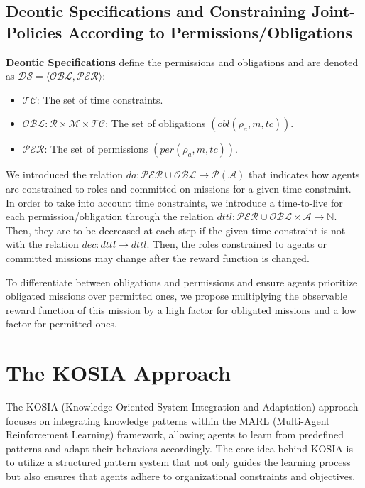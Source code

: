 \documentclass[sn-mathphys-num]{sn-jnl}%
\theoremstyle{thmstyleone}%
\theoremstyle{thmstyletwo}%
\theoremstyle{thmstylethree}%
\begin{document}
\subsection{Deontic Specifications and Constraining Joint-Policies According to Permissions/Obligations}

\textbf{Deontic Specifications} define the permissions and obligations and are denoted as $\mathcal{DS} = \langle \mathcal{OBL}, \mathcal{PER} \rangle$:

\begin{itemize}
    \item $\mathcal{TC}$: The set of time constraints.
    \item $\mathcal{OBL}: \mathcal{R} \times \mathcal{M} \times \mathcal{TC}$: The set of obligations $(obl(\rho_a, m, tc))$.
    \item $\mathcal{PER}$: The set of permissions $(per(\rho_a, m, tc))$.
\end{itemize}

We introduced the relation $da: \mathcal{PER} \cup \mathcal{OBL} \rightarrow \mathcal{P}(\mathcal{A})$ that indicates how agents are constrained to roles and committed on missions for a given time constraint. In order to take into account time constraints, we introduce a time-to-live for each permission/obligation through the relation $dttl: \mathcal{PER} \cup \mathcal{OBL} \times \mathcal{A} \rightarrow \mathbb{N}$. Then, they are to be decreased at each step if the given time constraint is not  with the relation $dec: dttl \rightarrow dttl$. Then, the roles constrained to agents or committed missions may change after the reward function is changed.

To differentiate between obligations and permissions and ensure agents prioritize obligated missions over permitted ones, we propose multiplying the observable reward function of this mission by a high factor for obligated missions and a low factor for permitted ones.




\section{The KOSIA Approach}\label{sec:kosia}

The KOSIA (Knowledge-Oriented System Integration and Adaptation) approach focuses on integrating knowledge patterns within the MARL (Multi-Agent Reinforcement Learning) framework, allowing agents to learn from predefined patterns and adapt their behaviors accordingly. The core idea behind KOSIA is to utilize a structured pattern system that not only guides the learning process but also ensures that agents adhere to organizational constraints and objectives.
\end{document}

